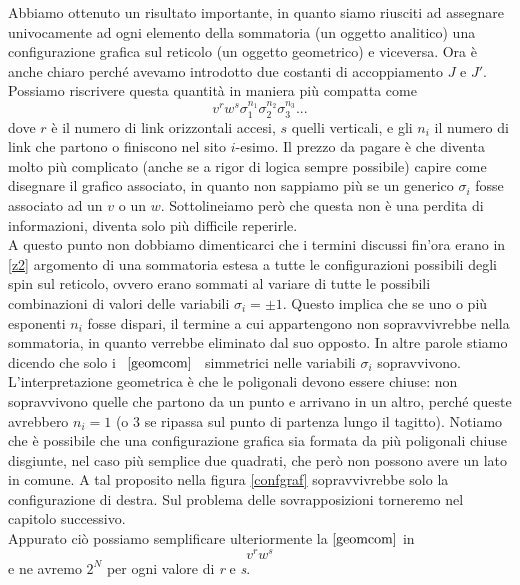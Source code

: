 \documentclass[11pt]{article}
\begin{document}
 Abbiamo ottenuto un risultato importante, in quanto siamo riusciti ad  assegnare univocamente ad ogni elemento della sommatoria (un oggetto analitico) una configurazione grafica sul reticolo (un oggetto geometrico) e viceversa.
 Ora è anche chiaro perché avevamo introdotto due costanti di accoppiamento $J$ e $J'$.\\
 Possiamo riscrivere questa quantità in maniera più compatta come
\begin{equation}\label{geomcom}
v^rw^s\sigma_1^{n_1}\sigma_2^{n_2}\sigma_3^{n_3}...
\end{equation}
dove $r$ è il numero di link orizzontali accesi, $s$ quelli verticali, e gli $n_i$ il numero di link che partono o finiscono nel sito $i$-esimo. Il prezzo da pagare è che diventa molto più complicato (anche se a rigor di logica sempre possibile) capire come disegnare il grafico associato, in quanto non sappiamo più se un generico $\sigma_{i}$ fosse associato ad un $v$ o un $w$. Sottolineiamo però che questa non è una perdita di informazioni, diventa solo più difficile reperirle.
\\A questo punto non dobbiamo dimenticarci che i termini discussi fin'ora erano in \ref{z2} argomento di una sommatoria  estesa a tutte le configurazioni possibili degli spin sul reticolo, ovvero erano sommati al variare di tutte le possibili combinazioni di valori delle variabili $\sigma_i=\pm1$. Questo implica che se uno o più esponenti $n_i$ fosse dispari, il termine a cui appartengono non sopravvivrebbe nella sommatoria, in quanto verrebbe eliminato dal suo opposto. In altre parole stiamo dicendo che solo i \ $\ref{geomcom}$ \  simmetrici nelle variabili $\sigma_i$ sopravvivono. \\
 L'interpretazione geometrica è che le poligonali devono essere chiuse: non sopravvivono quelle che partono da un punto e arrivano in un altro, perché queste avrebbero $n_i=1$ (o $3$ se ripassa sul punto di partenza lungo il tagitto). Notiamo che è possibile che una configurazione grafica sia formata da più poligonali chiuse disgiunte, nel caso più semplice due quadrati, che però non possono avere un lato in comune. A tal proposito nella figura \ref{confgraf} sopravvivrebbe solo la configurazione di destra. Sul problema delle sovrapposizioni torneremo nel capitolo successivo.\\
Appurato ciò possiamo semplificare ulteriormente la $\ref{geomcom}$ in
\begin{equation}\label{eq:test}
v^rw^s
\end{equation} 
e ne avremo $2^N$ per ogni valore di \emph{r} e \emph{s}.\\
\end{document}
